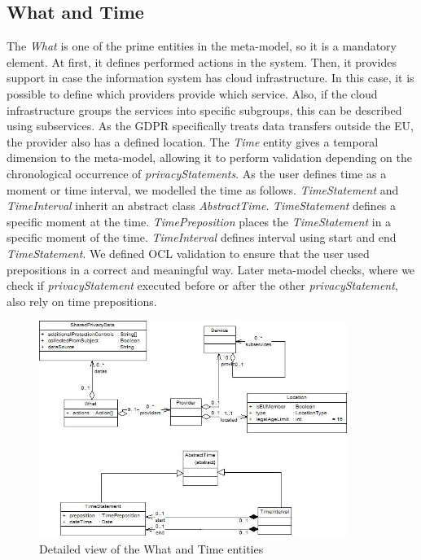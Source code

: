 \documentclass[11pt,english]{article}
\begin{document}
\subsection{What and Time}
The \emph{What} is one of the prime entities in the meta-model, so it is a mandatory element. At first, it defines performed actions in the system. Then, it provides support in case the information system has cloud infrastructure. In this case, it is possible to define which providers provide which service. Also, if the cloud infrastructure groups the services into specific subgroups, this can be described using subservices. As the GDPR specifically treats data transfers outside the EU, the provider also has a defined location. \newline The \emph{Time} entity gives a temporal dimension to the meta-model, allowing it to perform validation depending on the chronological occurrence of \emph{privacyStatements}. As the user defines time as a moment or time interval, we modelled the time as follows. \emph{TimeStatement} and \emph{TimeInterval} inherit an abstract class \emph{AbstractTime}. \emph{TimeStatement} defines a specific moment at the time. \emph{TimePreposition} places the \emph{TimeStatement} in a specific moment of the time. \emph{TimeInterval} defines interval using start and end \emph{TimeStatement}. We defined OCL validation to ensure that the user used prepositions in a correct and meaningful way. Later meta-model checks, where we check if \emph{privacyStatement} executed before or after the other \emph{privacyStatement}, also rely on time prepositions.
\begin{figure}[H]
    \centering
    \includegraphics[width=10cm,scale=0.5]{images/whatAndTime.jpg}
    \caption{Detailed view of the What and Time entities}
    \label{fig:WhatAndTime}
\end{figure}
\end{document}
